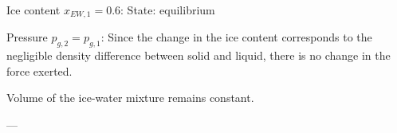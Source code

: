 Ice content \( x_{EW,1} = 0.6 \):  
State: equilibrium  

Pressure \( p_{g,2} = p_{g,1} \):  
Since the change in the ice content corresponds to the negligible density difference between solid and liquid, there is no change in the force exerted.  

Volume of the ice-water mixture remains constant.  

---